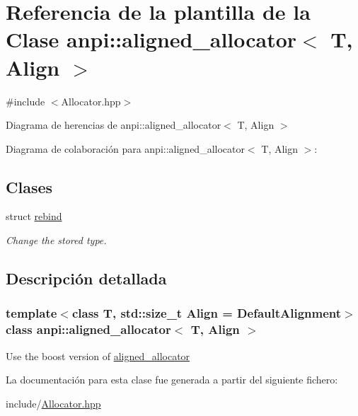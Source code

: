 \hypertarget{classanpi_1_1aligned__allocator}{}\section{Referencia de la plantilla de la Clase anpi\+:\+:aligned\+\_\+allocator$<$ T, Align $>$}
\label{classanpi_1_1aligned__allocator}


{\ttfamily \#include $<$Allocator.\+hpp$>$}



Diagrama de herencias de anpi\+:\+:aligned\+\_\+allocator$<$ T, Align $>$


Diagrama de colaboración para anpi\+:\+:aligned\+\_\+allocator$<$ T, Align $>$\+:
\subsection*{Clases}
\begin{DoxyCompactItemize}
\item 
struct \hyperlink{structanpi_1_1aligned__allocator_1_1rebind}{rebind}
\begin{DoxyCompactList}\small\item\em Change the stored type. \end{DoxyCompactList}\end{DoxyCompactItemize}


\subsection{Descripción detallada}
\subsubsection*{template$<$class T, std\+::size\+\_\+t Align = Default\+Alignment$>$\newline
class anpi\+::aligned\+\_\+allocator$<$ T, Align $>$}

Use the boost version of \hyperlink{classanpi_1_1aligned__allocator}{aligned\+\_\+allocator} 

La documentación para esta clase fue generada a partir del siguiente fichero\+:\begin{DoxyCompactItemize}
\item 
include/\hyperlink{Allocator_8hpp}{Allocator.\+hpp}\end{DoxyCompactItemize}
